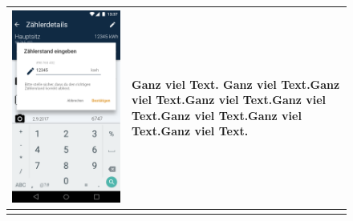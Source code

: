 \begin{figure}[h]
\begin{tabularx}{\textwidth}{X | X}
	\includegraphics[scale = 0.22]{img/AndroidMockup/manuelEntry} & Ganz viel Text. Ganz viel Text.Ganz viel Text.Ganz viel Text.Ganz viel Text.Ganz viel Text.Ganz viel Text.Ganz viel Text. \\ \hline \\

\end{tabularx}
\end{figure}
